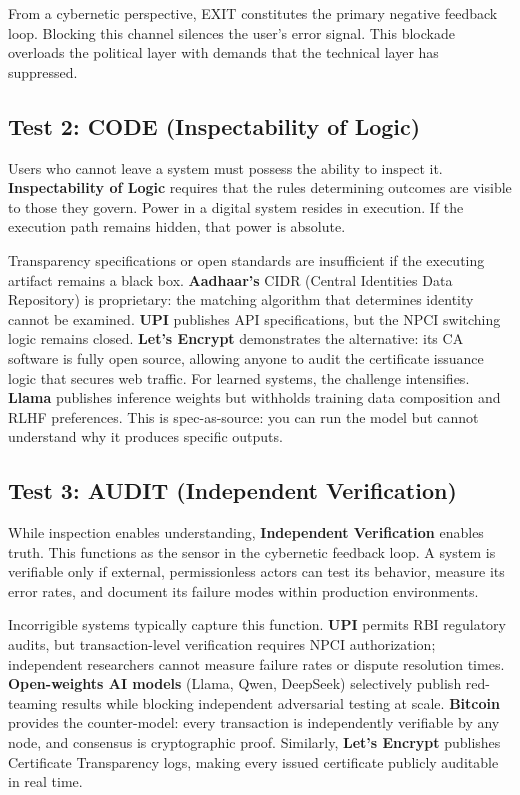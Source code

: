 \documentclass{article}
\begin{document}
From a cybernetic perspective, EXIT constitutes the primary negative feedback loop. Blocking this channel silences the user's error signal. This blockade overloads the political layer with demands that the technical layer has suppressed.

\subsection{Test 2: CODE (Inspectability of Logic)}

Users who cannot leave a system must possess the ability to inspect it. \textbf{Inspectability of Logic} requires that the rules determining outcomes are visible to those they govern. Power in a digital system resides in execution. If the execution path remains hidden, that power is absolute.

Transparency specifications or open standards are insufficient if the executing artifact remains a black box. \textbf{Aadhaar's} CIDR (Central Identities Data Repository) is proprietary: the matching algorithm that determines identity cannot be examined. \textbf{UPI} publishes API specifications, but the NPCI switching logic remains closed. \textbf{Let's Encrypt} demonstrates the alternative: its CA software is fully open source, allowing anyone to audit the certificate issuance logic that secures web traffic. For learned systems, the challenge intensifies. \textbf{Llama} publishes inference weights but withholds training data composition and RLHF preferences. This is spec-as-source: you can run the model but cannot understand why it produces specific outputs.

\subsection{Test 3: AUDIT (Independent Verification)}

While inspection enables understanding, \textbf{Independent Verification} enables truth. This functions as the sensor in the cybernetic feedback loop. A system is verifiable only if external, permissionless actors can test its behavior, measure its error rates, and document its failure modes within production environments.

Incorrigible systems typically capture this function. \textbf{UPI} permits RBI regulatory audits, but transaction-level verification requires NPCI authorization; independent researchers cannot measure failure rates or dispute resolution times. \textbf{Open-weights AI models} (Llama, Qwen, DeepSeek) selectively publish red-teaming results while blocking independent adversarial testing at scale. \textbf{Bitcoin} provides the counter-model: every transaction is independently verifiable by any node, and consensus is cryptographic proof. Similarly, \textbf{Let's Encrypt} publishes Certificate Transparency logs, making every issued certificate publicly auditable in real time.
\end{document}
